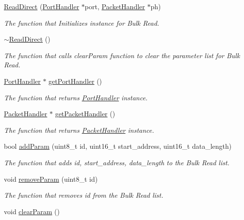 \begin{DoxyCompactItemize}
\item 
\hyperlink{classmercury_1_1_read_direct_a6f4833d330e4ae483e71338420a03aa3}{Read\+Direct} (\hyperlink{classmercury_1_1_port_handler}{Port\+Handler} $\ast$port, \hyperlink{classmercury_1_1_packet_handler}{Packet\+Handler} $\ast$ph)
\begin{DoxyCompactList}\small\item\em The function that Initializes instance for Bulk Read. \end{DoxyCompactList}\item 
\hyperlink{classmercury_1_1_read_direct_a22d47618c53289739b402b49187526c4}{$\sim$\+Read\+Direct} ()\hypertarget{classmercury_1_1_read_direct_a22d47618c53289739b402b49187526c4}{}\label{classmercury_1_1_read_direct_a22d47618c53289739b402b49187526c4}

\begin{DoxyCompactList}\small\item\em The function that calls clear\+Param function to clear the parameter list for Bulk Read. \end{DoxyCompactList}\item 
\hyperlink{classmercury_1_1_port_handler}{Port\+Handler} $\ast$ \hyperlink{classmercury_1_1_read_direct_ae249107c7036cf9d6c5419d99aa627e9}{get\+Port\+Handler} ()
\begin{DoxyCompactList}\small\item\em The function that returns \hyperlink{classmercury_1_1_port_handler}{Port\+Handler} instance. \end{DoxyCompactList}\item 
\hyperlink{classmercury_1_1_packet_handler}{Packet\+Handler} $\ast$ \hyperlink{classmercury_1_1_read_direct_aa4815ffba5ed207db5b773846611be64}{get\+Packet\+Handler} ()
\begin{DoxyCompactList}\small\item\em The function that returns \hyperlink{classmercury_1_1_packet_handler}{Packet\+Handler} instance. \end{DoxyCompactList}\item 
bool \hyperlink{classmercury_1_1_read_direct_ad0c586d8d610414f9dea589b181ea48a}{add\+Param} (uint8\+\_\+t id, uint16\+\_\+t start\+\_\+address, uint16\+\_\+t data\+\_\+length)
\begin{DoxyCompactList}\small\item\em The function that adds id, start\+\_\+address, data\+\_\+length to the Bulk Read list. \end{DoxyCompactList}\item 
void \hyperlink{classmercury_1_1_read_direct_afb55a6de1588d05c9c15a09a25312b39}{remove\+Param} (uint8\+\_\+t id)
\begin{DoxyCompactList}\small\item\em The function that removes id from the Bulk Read list. \end{DoxyCompactList}\item 
void \hyperlink{classmercury_1_1_read_direct_ad114e00d53b0930d81e402d09fc8cc36}{clear\+Param} ()\hypertarget{classmercury_1_1_read_direct_ad114e00d53b0930d81e402d09fc8cc36}{}\label{classmercury_1_1_read_direct_ad114e00d53b0930d81e402d09fc8cc36}


\end{DoxyCompactItemize}
